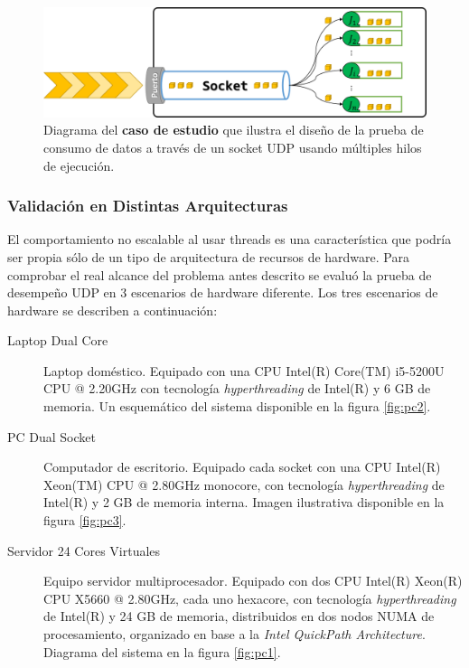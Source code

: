 \begin{figure}[!h]
	\centering
	\includegraphics[scale=0.5]{imagenes/casoDeEstudio.png}
	\caption{Diagrama del \textbf{caso de estudio} que ilustra el diseño de la prueba de consumo de datos a través de un socket UDP usando múltiples hilos de ejecución.}
	\label{fig:testUDP}
\end{figure}

\subsubsection{Validación en Distintas Arquitecturas}

El comportamiento no escalable al usar threads es una característica que podría ser propia sólo de un tipo de arquitectura de recursos de hardware. Para comprobar el real alcance del problema antes descrito se evaluó la prueba de desempeño UDP en 3 escenarios de hardware diferente. Los tres escenarios de hardware se describen a continuación:

\begin{description}
\item[Laptop Dual Core] Laptop doméstico. Equipado con una CPU Intel(R) Core(TM) i5-5200U CPU @ 2.20GHz con tecnología \emph{hyperthreading} de Intel(R) y 6 GB de memoria. Un esquemático del sistema disponible en la figura \ref{fig:pc2}.
\item[PC Dual Socket] Computador de escritorio. Equipado cada socket con una CPU Intel(R) Xeon(TM) CPU @ 2.80GHz monocore, con tecnología \emph{hyperthreading} de Intel(R) y 2 GB de memoria interna. Imagen ilustrativa disponible en la figura \ref{fig:pc3}.
\item[Servidor 24 Cores Virtuales] Equipo servidor multiprocesador. Equipado con dos CPU Intel(R) Xeon(R) CPU X5660 @ 2.80GHz, cada uno hexacore, con tecnología \emph{hyperthreading} de Intel(R) y 24 GB de memoria, distribuidos en dos nodos NUMA de procesamiento, organizado en base a la \emph{Intel QuickPath Architecture}. Diagrama del sistema en la figura \ref{fig:pc1}.
\end{description}

